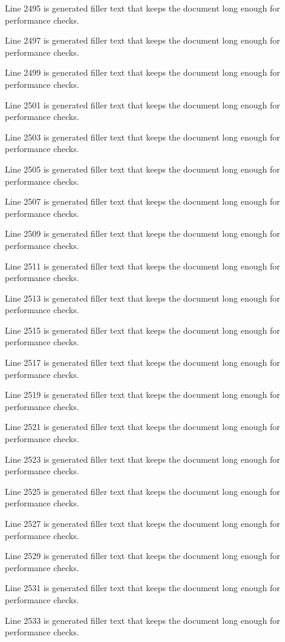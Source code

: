 Line 2495 is generated filler text that keeps the document long enough for performance checks.

Line 2497 is generated filler text that keeps the document long enough for performance checks.

Line 2499 is generated filler text that keeps the document long enough for performance checks.

Line 2501 is generated filler text that keeps the document long enough for performance checks.

Line 2503 is generated filler text that keeps the document long enough for performance checks.

Line 2505 is generated filler text that keeps the document long enough for performance checks.

Line 2507 is generated filler text that keeps the document long enough for performance checks.

Line 2509 is generated filler text that keeps the document long enough for performance checks.

Line 2511 is generated filler text that keeps the document long enough for performance checks.

Line 2513 is generated filler text that keeps the document long enough for performance checks.

Line 2515 is generated filler text that keeps the document long enough for performance checks.

Line 2517 is generated filler text that keeps the document long enough for performance checks.

Line 2519 is generated filler text that keeps the document long enough for performance checks.

Line 2521 is generated filler text that keeps the document long enough for performance checks.

Line 2523 is generated filler text that keeps the document long enough for performance checks.

Line 2525 is generated filler text that keeps the document long enough for performance checks.

Line 2527 is generated filler text that keeps the document long enough for performance checks.

Line 2529 is generated filler text that keeps the document long enough for performance checks.

Line 2531 is generated filler text that keeps the document long enough for performance checks.

Line 2533 is generated filler text that keeps the document long enough for performance checks.

